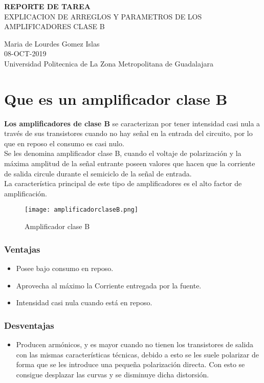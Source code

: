 \documentclass[11pt,a4paper]{article}
\begin{document}
\begin{center}
\textbf{REPORTE DE TAREA}\\
EXPLICACION DE ARREGLOS Y PARAMETROS DE LOS AMPLIFICADORES CLASE B
\end{center}

\begin{center}
Maria de Lourdes Gomez Islas\\
08-OCT-2019\\
Universidad Politecnica de La Zona Metropolitana de Guadalajara
\end{center}

\part{Que es un amplificador clase B}
\textbf{Los amplificadores de clase B} se caracterizan por tener intensidad casi nula a través de sus transistores cuando no hay señal en la entrada del circuito, por lo que en reposo el consumo es casi nulo.\\
 Se les denomina amplificador clase B, cuando el voltaje de polarización y la máxima amplitud de la señal entrante poseen valores que hacen que la corriente de salida circule durante el semiciclo de la señal de entrada.\\
La característica principal de este tipo de amplificadores es el alto factor de amplificación. 

\begin{figure}[h]
\centering
\texttt{[image: amplificadorclaseB.png]} 
\caption{Amplificador clase B}
\end{figure}

\section{Ventajas}
\begin{itemize}
\item Posee bajo consumo en reposo.
\item Aprovecha al máximo la Corriente entregada por la fuente.
\item Intensidad casi nula cuando está en reposo.
\end{itemize}

\section{Desventajas}
\begin{itemize}
\item Producen armónicos, y es mayor cuando no tienen los transistores de salida con las mismas características técnicas, debido a esto se les suele polarizar de forma que se les introduce una pequeña polarización directa. Con esto se consigue desplazar las curvas y se disminuye dicha distorsión.
\end{itemize}
\end{document}
